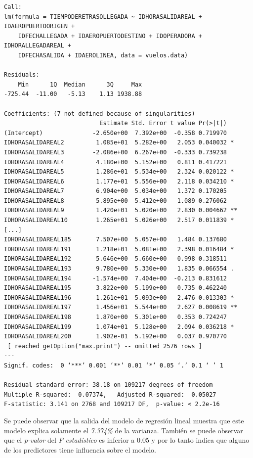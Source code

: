 \documentclass{article}
\begin{document}
\begin{lstlisting}
Call:
lm(formula = TIEMPODERETRASOLLEGADA ~ IDHORASALIDAREAL + IDAEROPUERTOORIGEN + 
    IDFECHALLEGADA + IDAEROPUERTODESTINO + IDOPERADORA + IDHORALLEGADAREAL + 
    IDFECHASALIDA + IDAEROLINEA, data = vuelos.data)

Residuals:
    Min      1Q  Median      3Q     Max 
-725.44  -11.00   -5.13    1.13 1938.88 

Coefficients: (7 not defined because of singularities)
                           Estimate Std. Error t value Pr(>|t|)    
(Intercept)              -2.650e+00  7.392e+00  -0.358 0.719970    
IDHORASALIDAREAL2         1.085e+01  5.282e+00   2.053 0.040032 *  
IDHORASALIDAREAL3        -2.086e+00  6.267e+00  -0.333 0.739238    
IDHORASALIDAREAL4         4.180e+00  5.152e+00   0.811 0.417221    
IDHORASALIDAREAL5         1.286e+01  5.534e+00   2.324 0.020122 *  
IDHORASALIDAREAL6         1.177e+01  5.556e+00   2.118 0.034210 *  
IDHORASALIDAREAL7         6.904e+00  5.034e+00   1.372 0.170205    
IDHORASALIDAREAL8         5.895e+00  5.412e+00   1.089 0.276062    
IDHORASALIDAREAL9         1.420e+01  5.020e+00   2.830 0.004662 ** 
IDHORASALIDAREAL10        1.265e+01  5.026e+00   2.517 0.011839 * 
[...]
IDHORASALIDAREAL185       7.507e+00  5.057e+00   1.484 0.137680    
IDHORASALIDAREAL191       1.218e+01  5.081e+00   2.398 0.016484 *  
IDHORASALIDAREAL192       5.646e+00  5.660e+00   0.998 0.318511    
IDHORASALIDAREAL193       9.780e+00  5.330e+00   1.835 0.066554 .  
IDHORASALIDAREAL194      -1.574e+00  7.404e+00  -0.213 0.831612    
IDHORASALIDAREAL195       3.822e+00  5.199e+00   0.735 0.462240    
IDHORASALIDAREAL196       1.261e+01  5.093e+00   2.476 0.013303 *  
IDHORASALIDAREAL197       1.456e+01  5.544e+00   2.627 0.008619 ** 
IDHORASALIDAREAL198       1.870e+00  5.301e+00   0.353 0.724247    
IDHORASALIDAREAL199       1.074e+01  5.128e+00   2.094 0.036218 *  
IDHORASALIDAREAL200       1.902e-01  5.192e+00   0.037 0.970770    
 [ reached getOption("max.print") -- omitted 2576 rows ]
---
Signif. codes:  0 ‘***’ 0.001 ‘**’ 0.01 ‘*’ 0.05 ‘.’ 0.1 ‘ ’ 1

Residual standard error: 38.18 on 109217 degrees of freedom
Multiple R-squared:  0.07374,	Adjusted R-squared:  0.05027 
F-statistic: 3.141 on 2768 and 109217 DF,  p-value: < 2.2e-16
\end{lstlisting}

Se puede observar que la salida del modelo de regresión lineal muestra que este modelo explica solamente el \textit{7.374\%} de la varianza. También se puede observar que el \textit{p-valor} del \textit{F estadístico} es inferior a 0.05 y por lo tanto indica que alguno de los predictores tiene influencia sobre el modelo.\\
\end{document}
